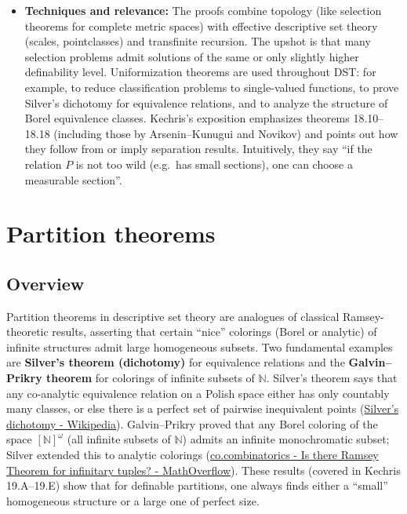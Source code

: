 \documentclass[11pt]{article}
\begin{document}
\begin{itemize}
\item \textbf{Techniques and relevance:} The proofs combine topology (like
selection theorems for complete metric spaces) with effective
descriptive set theory (scales, pointclasses) and transfinite
recursion. The upshot is that many selection problems admit solutions
of the same or only slightly higher definability level. Uniformization
theorems are used throughout DST: for example, to reduce
classification problems to single-valued functions, to prove Silver's
dichotomy for equivalence relations, and to analyze the structure of
Borel equivalence classes. Kechris's exposition emphasizes theorems
18.10--18.18 (including those by Arsenin--Kunugui and Novikov) and
points out how they follow from or imply separation results.
Intuitively, they say “if the relation \(P\) is not too wild (e.g. has
small sections), one can choose a measurable section”.
\end{itemize}
\section{Partition theorems}
\label{partition-theorems}
\subsection{Overview}
\label{overview-9}
Partition theorems in descriptive set theory are analogues of classical
Ramsey-theoretic results, asserting that certain “nice” colorings (Borel
or analytic) of infinite structures admit large homogeneous subsets. Two
fundamental examples are \textbf{Silver's theorem (dichotomy)} for equivalence
relations and the \textbf{Galvin--Prikry theorem} for colorings of infinite
subsets of \(\mathbb{N}\). Silver's theorem says that any co-analytic
equivalence relation on a Polish space either has only countably many
classes, or else there is a perfect set of pairwise inequivalent points
(\href{https://en.wikipedia.org/wiki/Silver\%27s\_dichotomy\#:\~:text=A\%20relation\%20is\%20said\%20to,2}{Silver's
dichotomy - Wikipedia}). Galvin--Prikry proved that any Borel coloring
of the space \([\mathbb{N}]^\omega\) (all infinite subsets of
\(\mathbb{N}\)) admits an infinite monochromatic subset; Silver extended
this to analytic colorings
(\href{https://mathoverflow.net/questions/67483/is-there-ramsey-theorem-for-infinitary-tuples\#:\~:text=In\%20contrast\%2C\%20Galvin\%20and\%20Prikry,Bbb\%7BN}{co.combinatorics -
Is there Ramsey Theorem for infinitary tuples? - MathOverflow}). These
results (covered in Kechris 19.A--19.E) show that for definable
partitions, one always finds either a “small” homogeneous structure or a
large one of perfect size.
\end{document}
